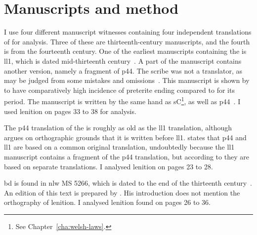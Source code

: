 \section{Manuscripts and method}
\label{sec:manuscripts-method}
I use four different manuscript witnesses containing four independent translations of  for analysis.
Three of these are thirteenth-century manuscripts, and the fourth is from the fourteenth century.
One of the earliest manuscripts containing the  is \acrfull{ll1}, which
is dated mid-thirteenth century~\autocite[179]{huws_medieval_2000}.  A part of
the manuscript contains another version, namely a fragment
of \gls{p44}. The scribe was not a translator, as may be judged from
some mistakes and omissions~\autocite[xxxvii]{roberts_brut_1971}. This manuscript is shown by \textcite[80--81]{Rod_Datable98} to have comparatively high incidence of preterite ending  compared to  for its period.
The manuscript is written by the same hand as \gls{sC}\footnote{See Chapter~\ref{cha:welsh-laws}.}, as well as  \gls{p44}~\autocite[179]{huws_medieval_2000}.
I used lenition on pages 33 to 38 for analysis.

The \acrfull{p44} translation of the  is roughly as old as the \gls{ll1} translation, although \textcite[85]{Rus_Orthography93} argues on orthographic grounds that it is written before \gls{ll1}. 
\Textcite[xix]{Lew_Brut42} states that \gls{p44} and \gls{ll1} are based on a common original translation, undoubtedly because the \gls{ll1} manuscript contains a fragment of the \gls{p44} translation, but according to \textcite[xliii--xliv]{Rob_Astudiaeth69}  they are based on separate translations.
I analysed lenition on pages 23 to 28.

\Acrfull{bd} is found in \gls{nlw} MS 5266, which  is dated to the end of the thirteenth century~\autocite[xliii]{Rob_Astudiaeth69}.
An edition of this text is prepared by \textcite{Lew_Brut42}.
His introduction does not mention the orthography of lenition.
I analysed lenition found on pages 26 to 36.


